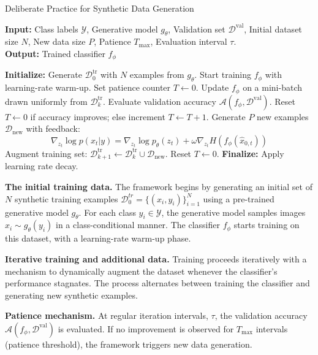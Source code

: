 \begin{algorithm}
  \caption{Deliberate Practice for Synthetic Data Generation}
  \label{alg:framework}
  \textbf{Input:} Class labels $\mathcal{Y}$, Generative model $g_\theta$, Validation set $\mathcal{D}^{\text{val}}$, Initial dataset size $N$, New data size $P$, Patience $T_{\text{max}}$, Evaluation interval $\tau$. \\
  \textbf{Output:} Trained classifier $f_\phi$
  \begin{algorithmic}[1]
    \State \textbf{Initialize:} Generate $\mathcal{D}_0^{\text{tr}}$ with $N$ examples from $g_\theta$. Start training $f_\phi$ with learning-rate warm-up.
    \State Set patience counter $T \gets 0$.
        \State Update $f_\phi$ on a mini-batch drawn uniformly from $\mathcal{D}_k^{\text{tr}}$.
            \State Evaluate validation accuracy $\mathcal{A}(f_\phi, \mathcal{D}^{\text{val}})$.
            \State Reset $T \leftarrow 0$ if accuracy improves; else increment $T \leftarrow T + 1$.
        \EndIf
            \State Generate $P$ new examples $\mathcal{D}_{\text{new}}$ with feedback:
            \[
            \nabla_{z_t} \log p(x_t | y) = \nabla_{z_t} \log p_\theta(z_t) + \omega \nabla_{z_t} H(f_\phi(\hat{x}_{0, t}))
            \]
            \State Augment training set: $\mathcal{D}_{k+1}^{\text{tr}} \gets \mathcal{D}_k^{\text{tr}} \cup \mathcal{D}_{\text{new}}$.
            \State Reset $T \gets 0$.
        \EndIf
    \EndWhile
    \State \textbf{Finalize:} Apply learning rate decay.
  \end{algorithmic}
\end{algorithm}

\textbf{The initial training data.}
The framework begins by generating an initial set of $N$ synthetic training examples $\mathcal{D}^{{tr}}_0 = \{(x_i, y_i)\}_{i=1}^N$ using a pre-trained generative model $g_\theta$. For each class $y_i \in \mathcal{Y}$, the generative model samples  images $x_i \sim g_\theta(y_i)$ in a class-conditional manner. The classifier $f_\phi$ starts training on this dataset, with a learning-rate warm-up phase.

\textbf{Iterative training and additional data.}
Training proceeds iteratively with a mechanism to dynamically augment the dataset whenever the classifier's performance stagnates. The process alternates between training the classifier and generating new synthetic examples.

\textbf{Patience mechanism.} 
At regular iteration intervals, $\tau$, the validation accuracy $\mathcal{A}(f_\phi, \mathcal{D}^{\text{val}})$ is evaluated. If no improvement is observed for $T_{\text{max}}$ intervals (patience threshold), the framework triggers new data generation. 

